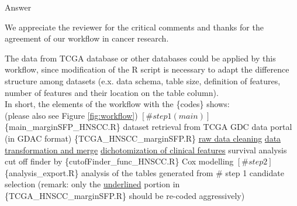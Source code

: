 \documentclass[preprint,12pt]{elsarticle}
\newenvironment{MyColorPar}[1]{%
    \leavevmode\color{#1}\ignorespaces%
}{%
}%
\begin{document}
\begin{MyColorPar}{blue}
Answer

We appreciate the reviewer for the critical comments and thanks for the agreement of our workflow in cancer research.

\begin{outline}
The data from TCGA database or other databases could be applied by this workflow, since modification of the R script is necessary to adapt the difference structure among datasets (e.x. data schema, table size, definition of features, number of features and their location on the table column).\\
In short, the elements of the workflow with the \{codes\} shows:\\
(please also see Figure \ref{fig:workflow})
\1 $[\# step 1 (main)]$
\{main\_marginSFP\_HNSCC.R\}
        \2 dataset retrieval from TCGA GDC data portal (in GDAC format)
    \2 \{TCGA\_HNSCC\_marginSFP.R\}
        \3 \underline{raw data cleaning}
        \3 \underline{data transformation and merge}
        \3 \underline{dichotomization of clinical features}
        \3 survival analysis
            \4 cut off finder by \{cutofFinder\_func\_HNSCC.R\}
            \4 Cox modelling
\1 $[\# step 2]$
\{analysis\_export.R\}
    \2 analysis of the tables generated from \# step 1
    \2 candidate selection
\1 (remark: only the \underline{underlined} portion in \{TCGA\_HNSCC\_marginSFP.R\} should be re-coded aggressively)
\end{outline}





\end{MyColorPar}
\end{document}
